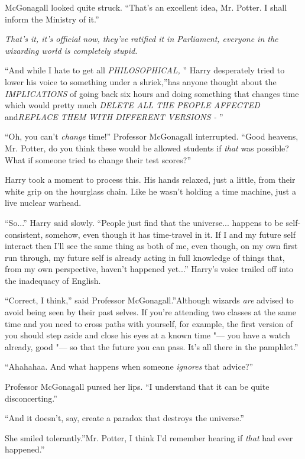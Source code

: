 McGonagall looked quite struck. ``That's an excellent idea, Mr. Potter.
I shall inform the Ministry of it.''

\emph{That's it, it's official now, they've ratified it in Parliament,
everyone in the wizarding world is completely stupid.}

``And while I hate to get all \emph{PHILOSOPHICAL,} '' Harry desperately
tried to lower his voice to something under a shriek,''has anyone
thought about the \emph{IMPLICATIONS} of going back six hours and doing
something that changes time which would pretty much \emph{DELETE ALL THE
PEOPLE AFFECTED} and\emph{REPLACE THEM WITH DIFFERENT VERSIONS -} ''

``Oh, you can't \emph{change} time!'' Professor McGonagall interrupted.
``Good heavens, Mr. Potter, do you think these would be allowed students
if \emph{that} was possible? What if someone tried to change their test
scores?''

Harry took a moment to process this. His hands relaxed, just a little,
from their white grip on the hourglass chain. Like he wasn't holding a
time machine, just a live nuclear warhead.

``So...'' Harry said slowly. ``People just find that the
universe... happens to be self-consistent, somehow, even though it
has time-travel in it. If I and my future self interact then I'll see
the same thing as both of me, even though, on my own first run through,
my future self is already acting in full knowledge of things that, from
my own perspective, haven't happened yet...'' Harry's voice trailed
off into the inadequacy of English.

``Correct, I think,'' said Professor McGonagall.''Although wizards
\emph{are} advised to avoid being seen by their past selves. If you're
attending two classes at the same time and you need to cross paths with
yourself, for example, the first version of you should step aside and
close his eyes at a known time "--- you have a watch already, good "--- so
that the future you can pass. It's all there in the pamphlet.''

``Ahahahaa. And what happens when someone \emph{ignores} that advice?''

Professor McGonagall pursed her lips. ``I understand that it can be
quite disconcerting.''

``And it doesn't, say, create a paradox that destroys the universe.''

She smiled tolerantly.''Mr. Potter, I think I'd remember hearing if
\emph{that} had ever happened.''

